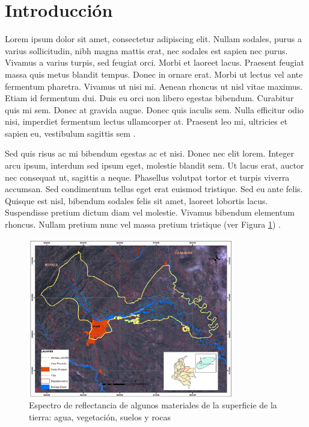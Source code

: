 \documentclass[artMGITG,SIG,accept,moreauthors,font4]{mgitg}
\begin{document}
%
\section{Introducción}
%
\noindent
Lorem ipsum dolor sit amet, consectetur adipiscing elit. Nullam sodales, purus a varius sollicitudin, nibh magna mattis erat, nec sodales est sapien nec purus. Vivamus a varius turpis, sed feugiat orci. Morbi et laoreet lacus. Praesent feugiat massa quis metus blandit tempus. Donec in ornare erat. Morbi ut lectus vel ante fermentum pharetra. Vivamus ut nisi mi. Aenean rhoncus ut nisl vitae maximus. Etiam id fermentum dui. Duis eu orci non libero egestas bibendum. Curabitur quis mi sem. Donec at gravida augue. Donec quis iaculis sem. Nulla efficitur odio nisi, imperdiet fermentum lectus ullamcorper at. Praesent leo mi, ultricies et sapien eu, vestibulum sagittis sem \cite{Ref01,Ref12,Ref13}.

Sed quis risus ac mi bibendum egestas ac et nisi. Donec nec elit lorem. Integer arcu ipsum, interdum sed ipsum eget, molestie blandit sem. Ut lacus erat, auctor nec consequat ut, sagittis a neque. Phasellus volutpat tortor et turpis viverra accumsan. Sed condimentum tellus eget erat euismod tristique. Sed eu ante felis. Quisque est nisl, bibendum sodales felis sit amet, laoreet lobortis lacus. Suspendisse pretium dictum diam vel molestie. Vivamus bibendum elementum rhoncus. Nullam pretium nunc vel massa pretium tristique (ver Figura \ref{fig1}) \cite{Ref13}. 

\begin{figure}[!ht]
    \centering
    \includegraphics[width=0.8\textwidth]{figuras/figura1}
    \caption{Espectro de reflectancia de algunos materiales de la superficie de la tierra: agua, vegetación, suelos y rocas}
    \label{fig1}
\end{figure}
\end{document}
